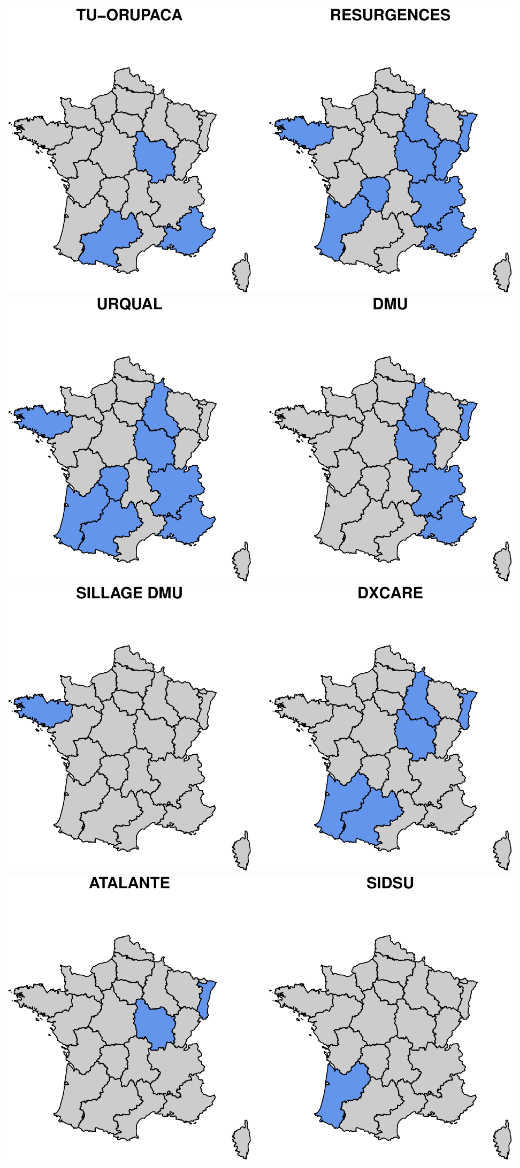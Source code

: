 \documentclass[]{article}
\begin{document}
\includegraphics{septembre2015_files/figure-latex/unnamed-chunk-7-1.pdf}
\includegraphics{septembre2015_files/figure-latex/unnamed-chunk-7-2.pdf}
\includegraphics{septembre2015_files/figure-latex/unnamed-chunk-7-3.pdf}
\includegraphics{septembre2015_files/figure-latex/unnamed-chunk-7-4.pdf}
\end{document}
